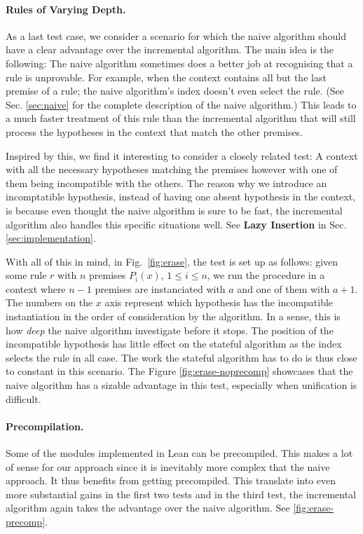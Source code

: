 \documentclass[runningheads]{llncs}
\begin{document}
\paragraph{Rules of Varying Depth.}
As a last test case, we consider a scenario for which the naive algorithm should have a clear advantage over the incremental algorithm.
The main idea is the following: The naive algorithm sometimes does a better job at recognising that a rule is unprovable.
For example, when the context contains all but the last premise of a rule; the naive algorithm's index doesn't even select the rule. (See Sec. \ref{sec:naive} for the complete description of the naive algorithm.)
This leads to a much faster treatment of this rule than the incremental algorithm that will still process the hypotheses in the context that match the other premises.

Inspired by this, we find it interesting to consider a closely related test: A context with all the necessary hypotheses matching the premises however with one of them being incompatible with the others.
The reason why we introduce an incomptatible hypothesis, instead of having one absent hypothesis in the context, is because even thought the naive algorithm is sure to be fast, the incremental algorithm also handles this specific situations well.
See \textbf{Lazy Insertion} in Sec. \ref{sec:implementation}.

With all of this in mind, in Fig.~\ref{fig:erase}, the test is set up as follows: given some rule $r$ with $n$ premises $P_i(x)$, $1 \leq i \leq n$, we run the procedure in a context where $n-1$ premises are instanciated with $a$ and one of them with $a + 1$.
The numbers on the $x$ axis represent which hypothesis has the incompatible instantiation in the order of consideration by the algorithm.
In a sense, this is how \textit{deep} the naive algorithm investigate before it stops.
The position of the incompatible hypothesis has little effect on the stateful algorithm as the index selects the rule in all case.
The work the stateful algorithm has to do is thus close to constant in this scenario.
The Figure \ref{fig:erase-noprecomp} showcases that the naive algorithm has a sizable advantage in this test, especially when unification is difficult.

\paragraph{Precompilation.}

Some of the modules implemented in Lean can be precompiled.
This makes a lot of sense for our approach since it is inevitably more complex that the naive approach.
It thus benefits from getting precompiled.
This translate into even more substantial gains in the first two tests and in the third test, the incremental algorithm again takes the advantage over the naive algorithm. See \ref{fig:erase-precomp}.
\end{document}
